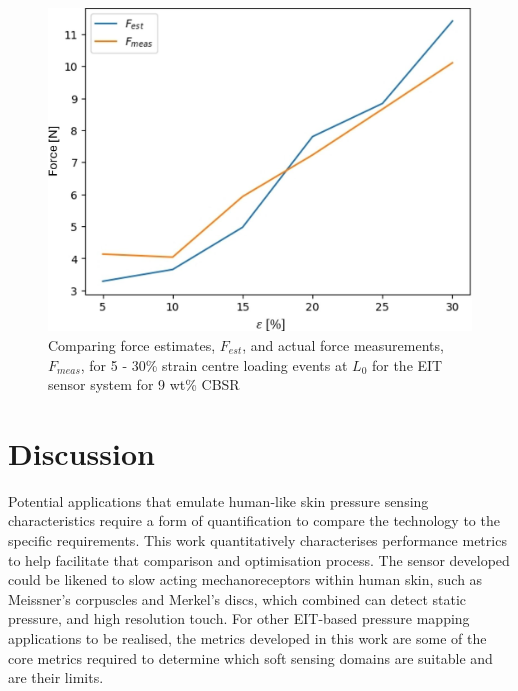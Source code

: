 \begin{figure}[H]
    \centering
    \includegraphics[width=0.7\linewidth]{Figures/CBSR_9p_2_9push_XXstrain_60s_1mA_3_force_est_frame31.jpg}
    \caption{Comparing force estimates, $F_{est}$, and actual force measurements, $F_{meas}$, for 5 - 30\% strain centre loading events at $L_0$ for the EIT sensor system for 9 wt\% CBSR}
    \label{fig:stress_est_9p_3}
\end{figure}


\section{Discussion}\label{sec:Discussion}
Potential applications that emulate human-like skin pressure sensing characteristics require a form of quantification to compare the technology to the specific requirements. This work quantitatively characterises performance metrics to help facilitate that comparison and optimisation process. The sensor developed could be likened to slow acting mechanoreceptors within human skin, such as Meissner's corpuscles and Merkel's discs, which combined can detect static pressure, and high resolution touch. For other EIT-based pressure mapping applications to be realised, the metrics developed in this work are some of the core metrics required to determine which soft sensing domains are suitable and are their limits.

